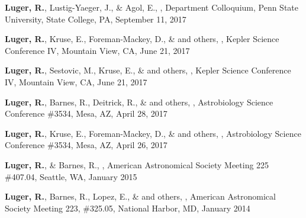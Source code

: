 \item\textbf{Luger, R.}, Lustig-Yaeger, J., \& Agol, E., , Department Colloquium, Penn State University, State College, PA, September 11, 2017

\item\textbf{Luger, R.}, Kruse, E., Foreman-Mackey, D., \& and others, , Kepler Science Conference IV, Mountain View, CA, June 21, 2017

\item\textbf{Luger, R.}, Sestovic, M., Kruse, E., \& and others, , Kepler Science Conference IV, Mountain View, CA, June 21, 2017

\item\textbf{Luger, R.}, Barnes, R., Deitrick, R., \& and others, , Astrobiology Science Conference \#3534, Mesa, AZ, April 28, 2017

\item\textbf{Luger, R.}, Kruse, E., Foreman-Mackey, D., \& and others, , Astrobiology Science Conference \#3534, Mesa, AZ, April 26, 2017

\item\textbf{Luger, R.}, \& Barnes, R., , American Astronomical Society Meeting 225 \#407.04, Seattle, WA, January 2015

\item\textbf{Luger, R.}, Barnes, R., Lopez, E., \& and others, , American Astronomical Society Meeting 223, \#325.05, National Harbor, MD, January 2014
